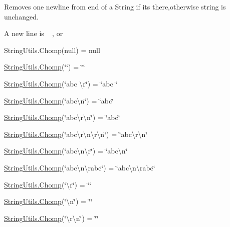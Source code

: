 Removes one newline from end of a String if it\textquotesingle{}s there,otherwise string is unchanged. 

A new line is ~\newline
, or ~\newline
 

String\+Utils.\+Chomp(null) = null 

\hyperlink{class_ultimate_1_1_utilities_1_1_string_utils_aaf5bda5ea98303526302e584936ec57c}{String\+Utils.\+Chomp}(\char`\"{}\char`\"{}) = \char`\"{}\char`\"{} 

\hyperlink{class_ultimate_1_1_utilities_1_1_string_utils_aaf5bda5ea98303526302e584936ec57c}{String\+Utils.\+Chomp}(\char`\"{}abc \textbackslash{}r\char`\"{}) = \char`\"{}abc \char`\"{} 

\hyperlink{class_ultimate_1_1_utilities_1_1_string_utils_aaf5bda5ea98303526302e584936ec57c}{String\+Utils.\+Chomp}(\char`\"{}abc\textbackslash{}n\char`\"{}) = \char`\"{}abc\char`\"{} 

\hyperlink{class_ultimate_1_1_utilities_1_1_string_utils_aaf5bda5ea98303526302e584936ec57c}{String\+Utils.\+Chomp}(\char`\"{}abc\textbackslash{}r\textbackslash{}n\char`\"{}) = \char`\"{}abc\char`\"{} 

\hyperlink{class_ultimate_1_1_utilities_1_1_string_utils_aaf5bda5ea98303526302e584936ec57c}{String\+Utils.\+Chomp}(\char`\"{}abc\textbackslash{}r\textbackslash{}n\textbackslash{}r\textbackslash{}n\char`\"{}) = \char`\"{}abc\textbackslash{}r\textbackslash{}n\char`\"{} 

\hyperlink{class_ultimate_1_1_utilities_1_1_string_utils_aaf5bda5ea98303526302e584936ec57c}{String\+Utils.\+Chomp}(\char`\"{}abc\textbackslash{}n\textbackslash{}r\char`\"{}) = \char`\"{}abc\textbackslash{}n\char`\"{} 

\hyperlink{class_ultimate_1_1_utilities_1_1_string_utils_aaf5bda5ea98303526302e584936ec57c}{String\+Utils.\+Chomp}(\char`\"{}abc\textbackslash{}n\textbackslash{}rabc\char`\"{}) = \char`\"{}abc\textbackslash{}n\textbackslash{}rabc\char`\"{} 

\hyperlink{class_ultimate_1_1_utilities_1_1_string_utils_aaf5bda5ea98303526302e584936ec57c}{String\+Utils.\+Chomp}(\char`\"{}\textbackslash{}r\char`\"{}) = \char`\"{}\char`\"{} 

\hyperlink{class_ultimate_1_1_utilities_1_1_string_utils_aaf5bda5ea98303526302e584936ec57c}{String\+Utils.\+Chomp}(\char`\"{}\textbackslash{}n\char`\"{}) = \char`\"{}\char`\"{} 

\hyperlink{class_ultimate_1_1_utilities_1_1_string_utils_aaf5bda5ea98303526302e584936ec57c}{String\+Utils.\+Chomp}(\char`\"{}\textbackslash{}r\textbackslash{}n\char`\"{}) = \char`\"{}\char`\"{} 


